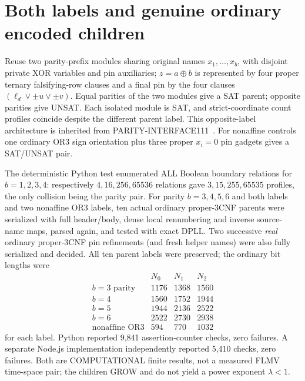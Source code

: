 \documentclass[11pt]{article}
\begin{document}
\section{Both labels and genuine ordinary encoded children}
Reuse two parity-prefix modules sharing original names $x_1,\ldots,x_b$, with disjoint private XOR variables and pin auxiliaries; $z=a\oplus b$ is represented by four proper ternary falsifying-row clauses and a final pin by the four clauses $(\ell_d\vee\pm u\vee\pm v)$. Equal parities of the two modules give a SAT parent; opposite parities give UNSAT. Each isolated module is SAT, and strict-coordinate count profiles coincide despite the different parent label. This opposite-label architecture is inherited from PARITY-INTERFACE111~\cite{prior}. For nonaffine controls one ordinary OR3 sign orientation plus three proper $x_i=0$ pin gadgets gives a SAT/UNSAT pair.

The deterministic Python test enumerated ALL Boolean boundary relations for $b=1,2,3,4$: respectively $4,16,256,65536$ relations gave $3,15,255,65535$ profiles, the only collision being the parity pair. For parity $b=3,4,5,6$ and both labels and two nonaffine OR3 labels, ten actual ordinary proper-3CNF parents were serialized with full header/body, dense local renumbering and inverse source-name maps, parsed again, and tested with exact DPLL. Two successive \emph{real} ordinary proper-3CNF pin refinements (and fresh helper names) were also fully serialized and decided. All ten parent labels were preserved; the ordinary bit lengths were
\[
\begin{array}{lrrr}
 &N_0&N_1&N_2\\\hline
b=3\text{ parity}&1176&1368&1560\\
b=4&1560&1752&1944\\
b=5&1944&2136&2522\\
b=6&2522&2730&2938\\
\text{nonaffine OR3}&594&770&1032
\end{array}
\]
for each label. Python reported 9,841 assertion-counter checks, zero failures. A separate Node.js implementation independently reported 5,410 checks, zero failures. Both are COMPUTATIONAL finite results, not a measured FLMV time-space pair; the children GROW and do not yield a power exponent $\lambda<1$.
\end{document}
